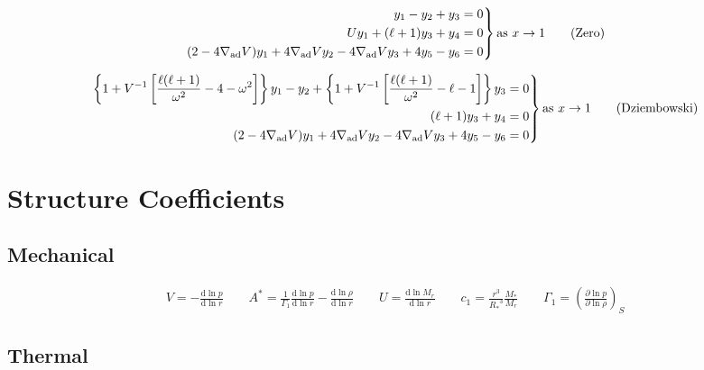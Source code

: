 \documentclass[fleqn]{article}
\newcommand{\diff}{\ensuremath{\mathrm{d}}}
\newcommand{\As}{\ensuremath{A^{\ast}}}
\newcommand{\nabad}{\ensuremath{\nabla_{\rm ad}}}
\newcommand{\Rstar}{\ensuremath{R_{\ast}}}
\newcommand{\Mstar}{\ensuremath{M_{\ast}}}
\begin{document}
\begin{equation*}
\left.
\begin{aligned}
y_{1} - y_{2} + y_{3} &= 0 \\
U y_{1} + (\ell + 1) y_{3} + y_{4} &= 0 \\
(2 - 4\nabad V) y_{1} + 4 \nabad V y_{2} - 4 \nabad V y_{3} + 4 y_{5} - y_{6} &= 0
\end{aligned}
\right\}
\text{as}\ x \rightarrow 1 \qquad \text{(Zero)}
\end{equation*}

\begin{equation*}
\left.
\begin{aligned}
\left\{ 1 + V^{-1} \left[ \frac{\ell(\ell+1)}{\omega^{2}} - 4 - \omega^{2} \right] \right\} y_{1} -
y_{2} +
\left\{ 1 + V^{-1} \left[ \frac{\ell(\ell+1)}{\omega^{2}} - \ell - 1 \right] \right\} y_{3} &= 0 \\
(\ell + 1) y_{3} + y_{4} &= 0 \\
(2 - 4\nabad V) y_{1} + 4 \nabad V y_{2} - 4 \nabad V y_{3} + 4 y_{5} - y_{6} &= 0
\end{aligned}
\right\}
\text{as}\ x \rightarrow 1 \qquad \text{(Dziembowski)}
\end{equation*}


\newpage

\section*{Structure Coefficients}

\subsection*{Mechanical}

\begin{gather*}
V = -\frac{\diff \ln p}{\diff \ln r} \qquad
\As = \frac{1}{\Gamma_{1}} \frac{\diff \ln p}{\diff \ln r} - \frac{\diff \ln \rho}{\diff \ln r} \qquad
U = \frac{\diff \ln M_{r}}{\diff \ln r} \qquad
c_1 = \frac{r^{3}}{\Rstar^{3}} \frac{\Mstar}{M_{r}} \qquad
\Gamma_{1} = \left( \frac{\partial \ln p}{\partial \ln \rho} \right)_{S}
\end{gather*}

\subsection*{Thermal}
\end{document}
